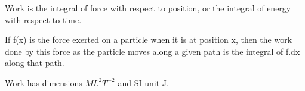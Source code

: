 Work is the integral of force with respect to position, or the integral
of energy with respect to time. 
\par
If f(x) is the force exerted on a particle when it is at position x, then
the work done by this force as the particle moves along a given path is
the integral of f.dx along that path.
\par
Work has dimensions $ML^{2}T^{-2}$  and SI unit J.
